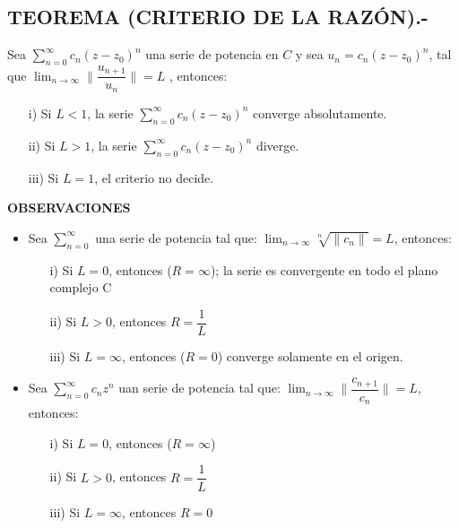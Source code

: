 \documentclass[10pt,a4paper]{article}
\begin{document}
\subsection{TEOREMA (CRITERIO DE LA RAZÓN).-}
Sea $\displaystyle{\sum_{n = 0}^{\infty} c_n (z-z_0)^n}$ una serie de potencia en $C$ y sea $u_n = c_n (z-z_0)^n$, tal que $\displaystyle{\lim_{n \to \infty} \parallel \dfrac{u_{n+1}}{u_n}  \parallel = L }$ , entonces:
\begin{itemize}
\item[i)] Si $L<1$, la serie $\displaystyle{\sum_{n = 0}^{\infty} c_n (z-z_0)^n}$ converge absolutamente.
\item[ii)] Si $L>1$, la serie $\displaystyle{\sum_{n = 0}^{\infty} c_n (z-z_0)^n}$ diverge.
\item[iii)] Si $L=1$, el criterio no decide.
\end{itemize}
\textbf{OBSERVACIONES}
\begin{itemize}
\item Sea $\displaystyle{\sum_{n=0}^{\infty}}$ una serie de potencia tal que: $\displaystyle{\lim_{n \to \infty} \sqrt[n]{\parallel c_n \parallel} = L}$, entonces:
\begin{itemize}
\item[i)] Si $L=0$, entonces ($R= \infty$); la serie es convergente en todo el plano complejo C
\item[ii)] Si $L>0$, entonces $\displaystyle{R = \dfrac{1}{L}}$
\item[iii)] Si $L= \infty$, entonces ($R = 0$) converge solamente en el origen.
\end{itemize}
\item Sea $\displaystyle{\sum_{n=0}^{\infty} c_n z^n}$ uan serie de potencia tal que: $\displaystyle{\lim_{n \to \infty} \parallel \dfrac{c_{n+1}}{c_n} \parallel = L}$, entonces: 
\begin{itemize}
\item[i)] Si $L=0$, entonces ($R= \infty$)
\item[ii)] Si $L>0$, entonces $\displaystyle{R = \dfrac{1}{L}}$
\item[iii)] Si $L= \infty$, entonces $R = 0$
\end{itemize}
\end{itemize}
\end{document}

